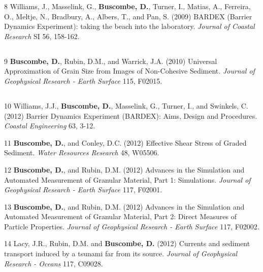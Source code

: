 \documentclass[margin,line]{resume}
\begin{document}
\begin{resume}
\begin{footnotesize}
\begin{list1}
	\item[8] Williams, J., Masselink, G., {\bf Buscombe, D.}, Turner, I., Matias, A., Ferreira, O., Meltje, N., Bradbury, A., Albers, T., and Pan, S. (2009) BARDEX (Barrier Dynamics Experiment): taking the beach into the laboratory. {\sl Journal of Coastal Research} SI 56, 158-162.
	\end{list1}

	\subsection{}
	\begin{list1}
	\item[9] {\bf Buscombe, D.}, Rubin, D.M., and Warrick, J.A. (2010) Universal Approximation of Grain Size from Images of Non-Cohesive Sediment. {\sl Journal of Geophysical Research - Earth Surface} 115, F02015.
	\end{list1}

	\subsection{}
	\begin{list1}
	\item[10] Williams, J.J., {\bf Buscombe, D.}, Masselink, G., Turner, I., and Swinkels, C. (2012) Barrier Dynamics Experiment (BARDEX): Aims, Design and Procedures. {\sl Coastal Engineering} 63, 3-12.\\

	\item[11] {\bf Buscombe, D.}, and Conley, D.C. (2012) Effective Shear Stress of Graded Sediment. {\sl Water Resources Research} 48, W05506.\\

	\item[12] {\bf Buscombe, D.}, and Rubin, D.M. (2012) Advances in the Simulation and Automated Measurement of Granular Material, Part 1: Simulations. {\sl Journal of Geophysical Research - Earth Surface} 117, F02001.\\

	\item[13] {\bf Buscombe, D.}, and Rubin, D.M. (2012) Advances in the Simulation and Automated Measurement of Granular Material, Part 2: Direct Measures of Particle Properties. {\sl Journal of Geophysical Research - Earth Surface} 117, F02002.\\

	\item[14] Lacy, J.R., Rubin, D.M. and {\bf Buscombe, D.} (2012) Currents and sediment transport induced by a tsunami far from its source. {\sl Journal of Geophysical Research - Oceans} 117, C09028.
	\end{list1}


\end{footnotesize}
\end{resume}
\end{document}
